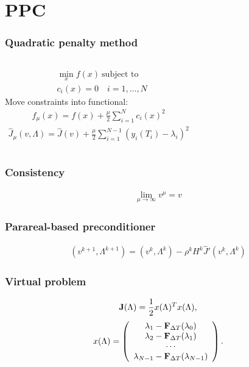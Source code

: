 \documentclass{beamer}
\begin{document}
\section{PPC}
\begin{frame}
\frametitle{Quadratic penalty method}
\begin{columns}
\centering
\begin{align*}
&\min_x f(x) \ \textrm{subject to} \\ &c_i(x)=0 \quad i=1,...,N
\end{align*}
Move constraints into functional:
\begin{align*}
f_{\mu}(x) = f(x) + \frac{\mu }{2}\sum_{i=1}^N c_i(x)^2 
\end{align*}
\begin{align*}
\hat{J}_{\mu}(v,\Lambda) = \hat{J}(v) + \frac{\mu}{2}\sum_{i=1}^{N-1}(y_{i}(T_i)-\lambda_i)^2
\end{align*}
\end{columns}
\end{frame}
\begin{frame}
\frametitle{Consistency}
\begin{align*}
\lim_{\mu\rightarrow\infty} v^{\mu}=v
\end{align*}
\end{frame}
\begin{frame}
\frametitle{Parareal-based preconditioner}
\begin{align*}
(v^{k+1},\Lambda^{k+1}) = (v^k,\Lambda^k) - \rho^kH^k \hat J'(v^k,\Lambda^k)
\end{align*}
\end{frame}
\begin{frame}
\frametitle{Virtual problem}

 \begin{align}
\bold J(\Lambda) = \frac{1}{2} x(\Lambda)^Tx(\Lambda), \label{non_lin_LS}
\end{align}
\begin{align}
x(\Lambda)=\left( \begin{array}{c}  
   \lambda_1 - \bold F_{\Delta T}(\lambda_0) \\ 
   \lambda_2 - \bold F_{\Delta T}(\lambda_1) \\
   \cdots  \\
   \lambda_{N-1} -\bold F_{\Delta T}(\lambda_{N-1}) \\
   \end{array}  \right).
\end{align}

\end{frame}
\end{document}
